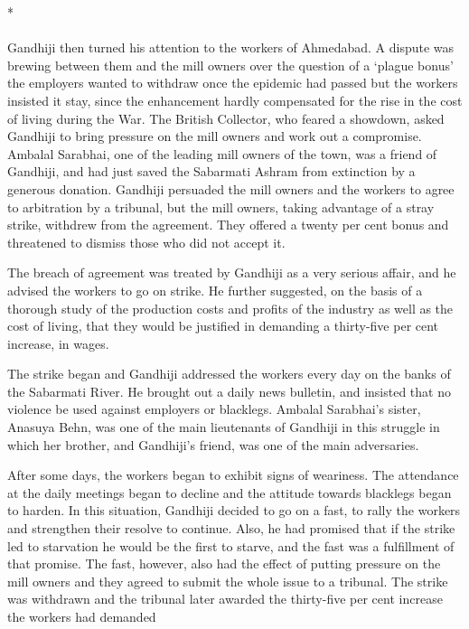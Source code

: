 \begin{multicols}{2}
\begin{center}*\end{center}

\paragraph*{}
Gandhiji then turned his attention to the workers of Ahmedabad. A dispute was brewing between them and the mill owners over the question of a `plague bonus' the employers wanted to withdraw once the epidemic had passed but the workers insisted it stay, since the enhancement hardly compensated for the rise in the cost of living during the War. The British Collector, who feared a showdown, asked Gandhiji to bring pressure on the mill owners and work out a compromise. Ambalal Sarabhai, one of the leading mill owners of the town, was a friend of Gandhiji, and had just saved the Sabarmati Ashram from extinction by a generous donation. Gandhiji persuaded the mill owners and the workers to agree to arbitration by a tribunal, but the mill owners, taking advantage of a stray strike, withdrew from the agreement. They offered a twenty per cent bonus and threatened to dismiss those who did not accept it.

The breach of agreement was treated by Gandhiji as a very serious affair, and he advised the workers to go on strike. He further suggested, on the basis of a thorough study of the production costs and profits of the industry as well as the cost of living, that they would be justified in demanding a thirty-five per cent increase, in wages.

The strike began and Gandhiji addressed the workers every day on the banks of the Sabarmati River. He brought out a daily news bulletin, and insisted that no violence be used against employers or blacklegs. Ambalal Sarabhai's sister, Anasuya Behn, was one of the main lieutenants of Gandhiji in this struggle in which her brother, and Gandhiji's friend, was one of the main adversaries.

After some days, the workers began to exhibit signs of weariness. The attendance at the daily meetings began to decline and the attitude towards blacklegs began to harden. In this situation, Gandhiji decided to go on a fast, to rally the workers and strengthen their resolve to continue. Also, he had promised that if the strike led to starvation he would be the first to starve, and the fast was a fulfillment of that promise. The fast, however, also had the effect of putting pressure on the mill owners and they agreed to submit the whole issue to a tribunal. The strike was withdrawn and the tribunal later awarded the thirty-five per cent increase the workers had demanded


\end{multicols}
